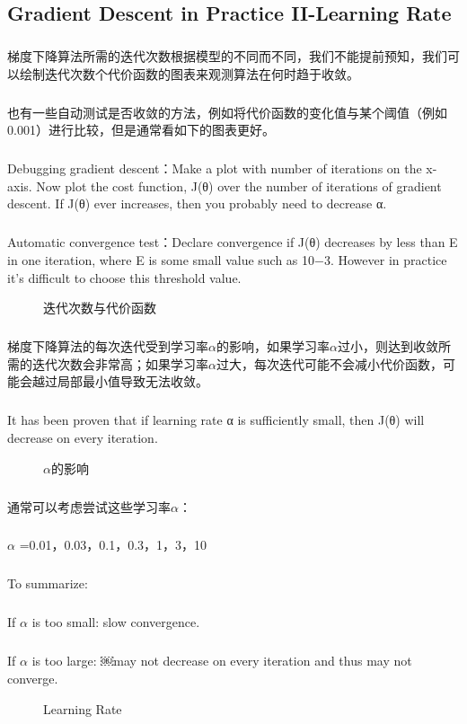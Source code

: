 \documentclass{article}
\begin{document}
\begin{CJK}{UTF8}{gbsn}
\subsection{Gradient Descent in Practice II-Learning Rate}
\subparagraph*{}
梯度下降算法所需的迭代次数根据模型的不同而不同，我们不能提前预知，我们可以绘制迭代次数个代价函数的图表来观测算法在何时趋于收敛。
\subparagraph*{}
也有一些自动测试是否收敛的方法，例如将代价函数的变化值与某个阈值（例如0.001）进行比较，但是通常看如下的图表更好。
\subparagraph*{}
Debugging gradient descent：Make a plot with number of iterations on the x-axis. Now plot the cost function, J(θ) over the number of iterations of gradient descent. If J(θ) ever increases, then you probably need to decrease α.
\subparagraph*{}
Automatic convergence test：Declare convergence if J(θ) decreases by less than E in one iteration, where E is some small value such as 10−3. However in practice it's difficult to choose this threshold value.
\begin{figure}[H]
\caption{迭代次数与代价函数}
\label{fig:226}
\end{figure}
\subparagraph*{}
梯度下降算法的每次迭代受到学习率$\alpha$的影响，如果学习率$\alpha$过小，则达到收敛所需的迭代次数会非常高；如果学习率$\alpha$过大，每次迭代可能不会减小代价函数，可能会越过局部最小值导致无法收敛。
\subparagraph*{}
It has been proven that if learning rate α is sufficiently small, then J(θ) will decrease on every iteration.
\begin{figure}[H]
\caption{$\alpha$的影响}
\label{fig:227}
\end{figure}
\subparagraph*{}
通常可以考虑尝试这些学习率$\alpha$：
\subparagraph*{}
$\alpha$ =0.01，0.03，0.1，0.3，1，3，10
\subparagraph*{}
To summarize:
\subparagraph*{}
If $\alpha$ is too small: slow convergence. 
\subparagraph*{}
If $\alpha$ is too large: ￼may not decrease on every iteration and thus may not converge.
\begin{figure}[H]
\caption{Learning Rate}
\label{fig:225}
\end{figure}

\end{CJK}
\end{document}
